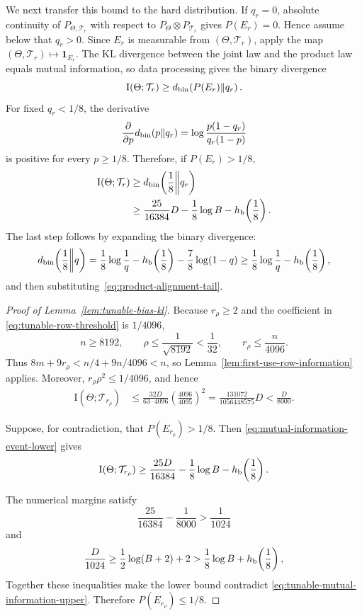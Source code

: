 \documentclass{article}
\theoremstyle{definition}
\begin{document}
We next transfer this bound to the hard distribution.  If $q_r=0$, absolute continuity of
$P_{\Theta,\mathcal T_r}$ with respect to
$P_\Theta\otimes P_{\mathcal T_r}$ gives
$P(E_r)=0$.  Hence assume below that $q_r>0$.  Since $E_r$ is measurable from
$(\Theta,\mathcal T_r)$, apply the map
$(\Theta,\mathcal T_r)\mapsto\mathbf 1_{E_r}$.  The KL divergence between the
joint law and the product law equals mutual information, so data processing
gives the binary divergence
\[
 \mathrm I(\Theta;\mathcal T_r)
 \ge d_{\rm bin}\!\left(P(E_r)\middle\|q_r\right).
\]
For fixed $q_r<1/8$, the derivative
\[
 \frac{\partial}{\partial p}d_{\rm bin}(p\|q_r)
 =
 \log\frac{p(1-q_r)}{q_r(1-p)}
\]
is positive for every $p\ge1/8$.  Therefore, if $P(E_r)>1/8$,
\begin{align}
 \mathrm I(\Theta;\mathcal T_r)
 &\ge d_{\rm bin}\!\left(\frac18\middle\|q_r\right)\nonumber\\
 &\ge
 \frac{25}{16384}D
 -\frac18\log B
 -h_{\rm b}\!\left(\frac18\right).
 \label{eq:mutual-information-event-lower}
\end{align}
The last step follows by expanding the binary divergence:
\[
 d_{\rm bin}\!\left(\frac18\middle\|q\right)
 =\frac18\log\frac1q-h_{\rm b}\!\left(\frac18\right)
  -\frac78\log(1-q)
 \ge \frac18\log\frac1q-h_{\rm b}\!\left(\frac18\right),
\]
and then substituting~\eqref{eq:product-alignment-tail}.

\begin{proof}[Proof of Lemma~\ref{lem:tunable-bias-kl}]
Because $r_\rho\ge2$ and the coefficient in
\eqref{eq:tunable-row-threshold} is $1/4096$,
\[
 n\ge8192,\qquad
 \rho\le\frac1{\sqrt{8192}}<\frac1{32},
 \qquad
 r_\rho\le\frac n{4096}.
\]
Thus $8m+9r_\rho<n/4+9n/4096<n$, so
Lemma~\ref{lem:first-use-row-information} applies.  Moreover,
$r_\rho\rho^2\le1/4096$, and hence
\begin{align}
 \mathrm I(\Theta;\mathcal T_{r_\rho})
 &\le
 \frac{32D}{63\cdot4096}
 \left(\frac{4096}{4095}\right)^2
 =
 \frac{131072}{1056448575}D
 <\frac D{8000}.
 \label{eq:tunable-mutual-information-upper}
\end{align}

Suppose, for contradiction, that $P(E_{r_\rho})>1/8$.  Then
\eqref{eq:mutual-information-event-lower} gives
\begin{equation*}
 \mathrm I(\Theta;\mathcal T_{r_\rho})
 \ge \frac{25D}{16384}-\frac18\log B
      -h_{\rm b}\!\left(\frac18\right).
\end{equation*}

The numerical margins satisfy
\[
 \frac{25}{16384}-\frac1{8000}>\frac1{1024}
\]
and
\[
 \frac D{1024}
 \ge\frac12\log(B+2)+2
 >
 \frac18\log B+h_{\rm b}\!\left(\frac18\right),
\]
Together these inequalities make the lower bound contradict
\eqref{eq:tunable-mutual-information-upper}.  Therefore
$P(E_{r_\rho})\le1/8$.
\end{proof}
\end{document}
